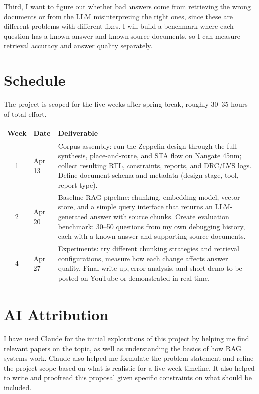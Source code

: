\documentclass[conference]{IEEEtran}
\begin{document}
Third, I want to figure out whether bad answers come from retrieving the wrong documents or from the LLM misinterpreting the right ones, since these are different problems with different fixes. I will build a benchmark where each question has a known answer and known source documents, so I can measure retrieval accuracy and answer quality separately.

\section{Schedule}
The project is scoped for the five weeks after spring break, roughly 30--35 hours of total effort.

\begin{table}[h]
\centering
\begin{tabular}{|c|l|p{5.5cm}|}
\hline
\textbf{Week} & \textbf{Date} & \textbf{Deliverable} \\
\hline
1 & Apr 13 & Corpus assembly: run the Zeppelin design through the full synthesis, place-and-route, and STA flow on Nangate 45nm; collect resulting RTL, constraints, reports, and DRC/LVS logs. Define document schema and metadata (design stage, tool, report type). \\
\hline
2 & Apr 20 & Baseline RAG pipeline: chunking, embedding model, vector store, and a simple query interface that returns an LLM-generated answer with source chunks. Create evaluation benchmark: 30--50 questions from my own debugging history, each with a known answer and supporting source documents. \\
\hline
4 & Apr 27 & Experiments: try different chunking strategies and retrieval configurations, measure how each change affects answer quality. Final write-up, error analysis, and short demo to be posted on YouTube or demonstrated in real time. \\
\hline
\end{tabular}
\end{table}

\section{AI Attribution}
I have used Claude for the initial explorations of this project by helping me find relevant papers on the topic, as well as understanding the basics of how RAG systems work. Claude also helped me formulate the problem statement and refine the project scope based on what is realistic for a five-week timeline. It also helped to write and proofread this proposal given specific constraints on what should be included. 



\end{document}
